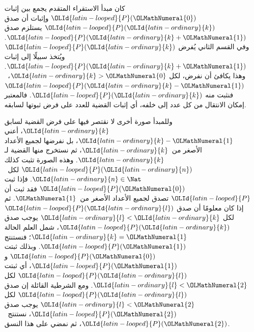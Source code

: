 \documentclass[../../../include/open-logic-section]{subfiles}
\begin{document}


كان مبدأ الاستقراء المتقدم يجمع بين إثبات ${\OLId{latin-looped}{P}}({\OLMathNumeral{0}})$ وإثبات أن صدق
${\OLId{latin-looped}{P}}({\OLId{latin-ordinary}{k}})$ يستلزم صدق ${\OLId{latin-looped}{P}}({\OLId{latin-ordinary}{k}}+{\OLMathNumeral{1}})$. وفي القسم الثاني يُفرض ${\OLId{latin-looped}{P}}({\OLId{latin-ordinary}{k}})$ ويُتخذ
سبيلًا إلى إثبات ${\OLId{latin-looped}{P}}({\OLId{latin-ordinary}{k}}+{\OLMathNumeral{1}})$. وهذا يكافئ أن نفرض، لكل ${\OLId{latin-ordinary}{k}}>{\OLMathNumeral{0}}$،~${\OLId{latin-looped}{P}}({\OLId{latin-ordinary}{k}}-{\OLMathNumeral{1}})$
فنثبت منه ${\OLId{latin-looped}{P}}({\OLId{latin-ordinary}{k}})$. فالمعتبر إمكان الانتقال من كل عدد إلى خلفه، أي
إثبات القضية للعدد على فرض ثبوتها لسابقه.

وللمبدأ صورة أخرى لا نقتصر فيها على فرض القضية لسابق ${\OLId{latin-ordinary}{k}}$، أعني
${\OLId{latin-ordinary}{k}}-{\OLMathNumeral{1}}$، بل نفرضها لجميع الأعداد الأصغر من~${\OLId{latin-ordinary}{k}}$، ثم نستخرج منها القضية
لـ${\OLId{latin-ordinary}{k}}$. وهذه الصورة تثبت كذلك ${\OLId{latin-looped}{P}}({\OLId{latin-ordinary}{n}})$ لكل~${\OLId{latin-ordinary}{n}} \in \Nat$. فإذا ثبت
${\OLId{latin-looped}{P}}({\OLMathNumeral{0}})$ فقد ثبت أن ${\OLId{latin-looped}{P}}$ تصدق لجميع الأعداد الأصغر من~${\OLMathNumeral{1}}$. ثم إذا كان
معلومًا أن صدق ${\OLId{latin-looped}{P}}({\OLId{latin-ordinary}{l}})$ لكل ${\OLId{latin-ordinary}{l}}<{\OLId{latin-ordinary}{k}}$ يوجب صدق ${\OLId{latin-looped}{P}}({\OLId{latin-ordinary}{k}})$، شمل العلم الحالة
${\OLId{latin-ordinary}{k}}={\OLMathNumeral{1}}$؛ فنستنتج ${\OLId{latin-looped}{P}}({\OLMathNumeral{1}})$. وبذلك ثبتت ${\OLId{latin-looped}{P}}({\OLMathNumeral{0}})$ و${\OLId{latin-looped}{P}}({\OLMathNumeral{1}})$، أي ثبتت
${\OLId{latin-looped}{P}}({\OLId{latin-ordinary}{l}})$ لكل ${\OLId{latin-ordinary}{l}}<{\OLMathNumeral{2}}$. ومع الشرطية القائلة إن صدق ${\OLId{latin-looped}{P}}({\OLId{latin-ordinary}{l}})$ لكل ${\OLId{latin-ordinary}{l}}<{\OLMathNumeral{2}}$ يوجب
صدق ${\OLId{latin-looped}{P}}({\OLMathNumeral{2}})$، نستنتج~${\OLId{latin-looped}{P}}({\OLMathNumeral{2}})$، ثم نمضي على هذا النسق.
\end{document}

